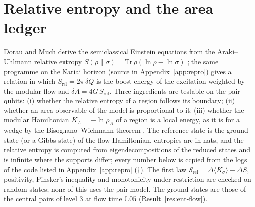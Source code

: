 \documentclass[11pt]{article}
\theoremstyle{definition}
\begin{document}
\section{Relative entropy and the area ledger}\label{sec:rel}
Dorau and Much \cite{doraumuch} derive the semiclassical Einstein equations from the Araki--Uhlmann relative entropy $S(\rho\|\sigma)=\mathrm{Tr}\,\rho(\ln\rho-\ln\sigma)$ \cite{umegaki1962,araki1976}; the same programme on the Nariai horizon (source in Appendix~\ref{app:repro}) gives a relation in which $S_{\mathrm{rel}}=2\pi\,\delta Q$ is the boost energy of the excitation weighted by the modular flow and $\delta A=4G\,S_{\mathrm{rel}}$. Three ingredients are testable on the pair qubits: (i) whether the relative entropy of a region follows its boundary; (ii) whether an area observable of the model is proportional to it; (iii) whether the modular Hamiltonian $K_A=-\ln\rho_A$ of a region is a local energy, as it is for a wedge by the Bisognano--Wichmann theorem \cite{bisognano1975}. The reference state is the ground state (or a Gibbs state) of the flow Hamiltonian, entropies are in nats, and the relative entropy is computed from eigendecompositions of the reduced states and is infinite where the supports differ; every number below is copied from the logs of the code listed in Appendix~\ref{app:repro} ($\dagger$). The first law $S_{\mathrm{rel}}=\Delta\langle K_\sigma\rangle-\Delta S$, positivity, Pinsker's inequality and monotonicity under restriction are checked on random states; none of this uses the pair model. The ground states are those of the central pairs of level $3$ at flow time $0.05$ (Result~\ref{res:ent-flow}).
\end{document}
